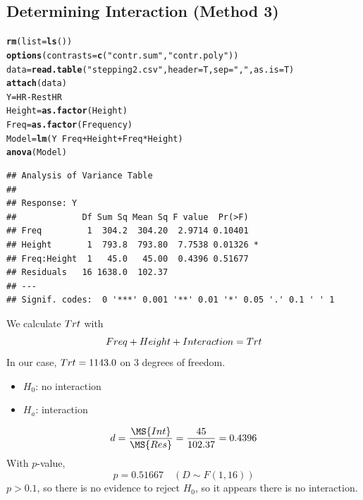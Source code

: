 \documentclass[oneside]{book}\usepackage[]{graphicx}\usepackage[dvipsnames,table,xcdraw]{xcolor}
\makeatletter
\newcommand{\hlstr}[1]{\textcolor[rgb]{0.192,0.494,0.8}{#1}}%
\newcommand{\hlopt}[1]{\textcolor[rgb]{0,0,0}{#1}}%
\newcommand{\hlstd}[1]{\textcolor[rgb]{0.345,0.345,0.345}{#1}}%
\newcommand{\hlkwb}[1]{\textcolor[rgb]{0.69,0.353,0.396}{#1}}%
\newcommand{\hlkwc}[1]{\textcolor[rgb]{0.333,0.667,0.333}{#1}}%
\newcommand{\hlkwd}[1]{\textcolor[rgb]{0.737,0.353,0.396}{\textbf{#1}}}%
\newenvironment{kframe}{%
 \def\at@end@of@kframe{}%
 \ifinner\ifhmode%
  \def\at@end@of@kframe{\end{minipage}}%
  \begin{minipage}{\columnwidth}%
 \fi\fi%
 \def\FrameCommand##1{\hskip\@totalleftmargin \hskip-\fboxsep
 \colorbox{shadecolor}{##1}\hskip-\fboxsep
     \hskip-\linewidth \hskip-\@totalleftmargin \hskip\columnwidth}%
 \MakeFramed {\advance\hsize-\width
   \@totalleftmargin\z@ \linewidth\hsize
   \@setminipage}}%
 {\par\unskip\endMakeFramed%
 \at@end@of@kframe}
\newenvironment{knitrout}{}{} %
\let\SS=\relax
\makeatother
\begin{document}
\subsection{Determining Interaction (Method 3)}
\begin{knitrout}
\color{fgcolor}\begin{kframe}
\begin{alltt}
\hlkwd{rm}\hlstd{(}\hlkwc{list} \hlstd{=} \hlkwd{ls}\hlstd{())}
\hlkwd{options}\hlstd{(}\hlkwc{contrasts} \hlstd{=} \hlkwd{c}\hlstd{(}\hlstr{"contr.sum"}\hlstd{,} \hlstr{"contr.poly"}\hlstd{))}
\hlstd{data} \hlkwb{=} \hlkwd{read.table}\hlstd{(}\hlstr{"stepping2.csv"}\hlstd{,} \hlkwc{header} \hlstd{= T,} \hlkwc{sep} \hlstd{=} \hlstr{","}\hlstd{,} \hlkwc{as.is} \hlstd{= T)}
\hlkwd{attach}\hlstd{(data)}
\hlstd{Y} \hlkwb{=} \hlstd{HR} \hlopt{-} \hlstd{RestHR}
\hlstd{Height} \hlkwb{=} \hlkwd{as.factor}\hlstd{(Height)}
\hlstd{Freq} \hlkwb{=} \hlkwd{as.factor}\hlstd{(Frequency)}
\hlstd{Model} \hlkwb{=} \hlkwd{lm}\hlstd{(Y} \hlopt{~} \hlstd{Freq} \hlopt{+} \hlstd{Height} \hlopt{+} \hlstd{Freq} \hlopt{*} \hlstd{Height)}
\hlkwd{anova}\hlstd{(Model)}
\end{alltt}
\begin{verbatim}
## Analysis of Variance Table
## 
## Response: Y
##             Df Sum Sq Mean Sq F value  Pr(>F)  
## Freq         1  304.2  304.20  2.9714 0.10401  
## Height       1  793.8  793.80  7.7538 0.01326 *
## Freq:Height  1   45.0   45.00  0.4396 0.51677  
## Residuals   16 1638.0  102.37                  
## ---
## Signif. codes:  0 '***' 0.001 '**' 0.01 '*' 0.05 '.' 0.1 ' ' 1
\end{verbatim}
\end{kframe}
\end{knitrout}
We calculate $ \SS{Trt} $ with
\[ \SS{Freq}+\SS{Height}+\SS{Interaction}=\SS{Trt} \]
In our case, $ \SS{Trt}=1143.0 $ on $ 3 $ degrees of freedom.
\begin{itemize}
    \item $ H_0 $: no interaction
    \item $ H_a $: interaction
\end{itemize}
\[ d=\frac{\MS{Int}}{\MS{Res}} =\frac{45}{102.37}=0.4396  \]
With $ p $-value,
\[ p=0.51667\quad(D \sim  F(1,16)) \]
$ p>0.1 $, so there is no evidence to reject $ H_0 $,
so it appears there is no interaction.




\end{document}
